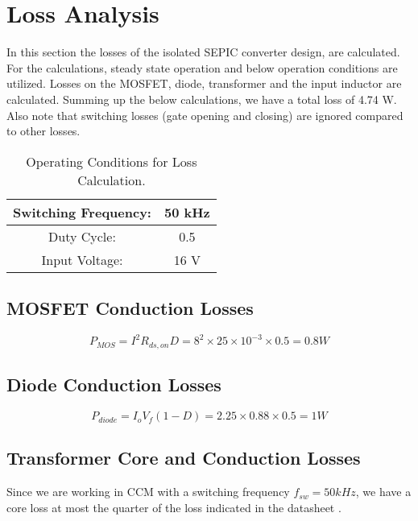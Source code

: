 \section{Loss Analysis}
In this section the losses of the isolated SEPIC converter design, are calculated. For the calculations, steady state operation and below operation conditions are utilized. Losses on the MOSFET, diode, transformer and the input inductor are calculated. Summing up the below calculations, we have a total loss of  4.74 W. Also note that switching losses (gate opening and closing) are ignored compared to other losses.

\begin{table}[H]
    \centering
    \caption{Operating Conditions for Loss Calculation.}
    \label{tab:los_conditions}
    \begin{tabular}{|c|c|}
        \hline
        Switching Frequency:        & 50 kHz    \\
        \hline
        Duty Cycle:                 & 0.5       \\
        \hline
        Input Voltage:              & 16 V      \\
        \hline
    \end{tabular}
\end{table}

\subsection{MOSFET Conduction Losses}
\begin{equation}
    P_{MOS} = I^2R_{ds,on}D = 8^2\times25\times10^{-3}\times0.5 = 0.8 W
\end{equation}

\subsection{Diode Conduction Losses}
\begin{equation}
    P_{diode} = I_oV_f(1-D) = 2.25\times0.88\times0.5 = 1 W
\end{equation}

\subsection{Transformer Core and Conduction Losses}
Since we are working in CCM with a switching frequency $f_{sw}=50 kHz$, we have a core loss at most the quarter of the loss indicated in the datasheet \cite{web:ferrite_cores}.

